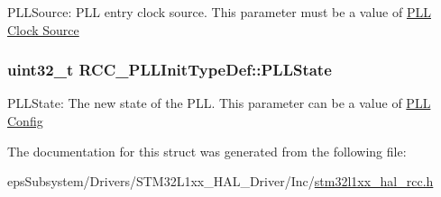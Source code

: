 P\-L\-L\-Source\-: P\-L\-L entry clock source. This parameter must be a value of \hyperlink{group___r_c_c___p_l_l___clock___source}{P\-L\-L Clock Source} \hypertarget{struct_r_c_c___p_l_l_init_type_def_a6cbaf84f6566af15e6e4f97a339d5759}{
\subsubsection[{P\-L\-L\-State}]{\setlength{\rightskip}{0pt plus 5cm}uint32\-\_\-t R\-C\-C\-\_\-\-P\-L\-L\-Init\-Type\-Def\-::\-P\-L\-L\-State}}\label{struct_r_c_c___p_l_l_init_type_def_a6cbaf84f6566af15e6e4f97a339d5759}
P\-L\-L\-State\-: The new state of the P\-L\-L. This parameter can be a value of \hyperlink{group___r_c_c___p_l_l___config}{P\-L\-L Config} 

The documentation for this struct was generated from the following file\-:\begin{DoxyCompactItemize}
\item 
eps\-Subsystem/\-Drivers/\-S\-T\-M32\-L1xx\-\_\-\-H\-A\-L\-\_\-\-Driver/\-Inc/\hyperlink{stm32l1xx__hal__rcc_8h}{stm32l1xx\-\_\-hal\-\_\-rcc.\-h}\end{DoxyCompactItemize}
